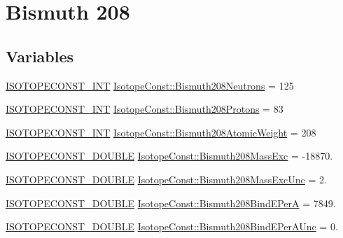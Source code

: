 \hypertarget{group___isotope_const-_bismuth-_bi208}{}\section{Bismuth 208}
\label{group___isotope_const-_bismuth-_bi208}
\subsection*{Variables}
\begin{DoxyCompactItemize}
\item 
\mbox{\hyperlink{group___isotope_const-_macros_ga5f18360b3e99483a35c32d789e62621c}{I\+S\+O\+T\+O\+P\+E\+C\+O\+N\+S\+T\+\_\+\+I\+NT}} \mbox{\hyperlink{group___isotope_const-_bismuth-_bi208_ga40ab444ee61c20c12a0172e54779f983}{Isotope\+Const\+::\+Bismuth208\+Neutrons}} = 125
\item 
\mbox{\hyperlink{group___isotope_const-_macros_ga5f18360b3e99483a35c32d789e62621c}{I\+S\+O\+T\+O\+P\+E\+C\+O\+N\+S\+T\+\_\+\+I\+NT}} \mbox{\hyperlink{group___isotope_const-_bismuth-_bi208_ga6ad34f2da74e0460bca20566deadcd7a}{Isotope\+Const\+::\+Bismuth208\+Protons}} = 83
\item 
\mbox{\hyperlink{group___isotope_const-_macros_ga5f18360b3e99483a35c32d789e62621c}{I\+S\+O\+T\+O\+P\+E\+C\+O\+N\+S\+T\+\_\+\+I\+NT}} \mbox{\hyperlink{group___isotope_const-_bismuth-_bi208_ga58b395a05223b5c11aa0f8f3c5637777}{Isotope\+Const\+::\+Bismuth208\+Atomic\+Weight}} = 208
\item 
\mbox{\hyperlink{group___isotope_const-_macros_ga8f45a7272ce02c0b4c65c44636ed719a}{I\+S\+O\+T\+O\+P\+E\+C\+O\+N\+S\+T\+\_\+\+D\+O\+U\+B\+LE}} \mbox{\hyperlink{group___isotope_const-_bismuth-_bi208_ga3b0a19e4060de80103b82520d961e371}{Isotope\+Const\+::\+Bismuth208\+Mass\+Exc}} = -\/18870.
\item 
\mbox{\hyperlink{group___isotope_const-_macros_ga8f45a7272ce02c0b4c65c44636ed719a}{I\+S\+O\+T\+O\+P\+E\+C\+O\+N\+S\+T\+\_\+\+D\+O\+U\+B\+LE}} \mbox{\hyperlink{group___isotope_const-_bismuth-_bi208_ga06f25454a4ba7e07e56e6b0b39fbec52}{Isotope\+Const\+::\+Bismuth208\+Mass\+Exc\+Unc}} = 2.
\item 
\mbox{\hyperlink{group___isotope_const-_macros_ga8f45a7272ce02c0b4c65c44636ed719a}{I\+S\+O\+T\+O\+P\+E\+C\+O\+N\+S\+T\+\_\+\+D\+O\+U\+B\+LE}} \mbox{\hyperlink{group___isotope_const-_bismuth-_bi208_ga46d6d56d52d32fc382852aa88d6d9e3e}{Isotope\+Const\+::\+Bismuth208\+Bind\+E\+PerA}} = 7849.
\item 
\mbox{\hyperlink{group___isotope_const-_macros_ga8f45a7272ce02c0b4c65c44636ed719a}{I\+S\+O\+T\+O\+P\+E\+C\+O\+N\+S\+T\+\_\+\+D\+O\+U\+B\+LE}} \mbox{\hyperlink{group___isotope_const-_bismuth-_bi208_ga483d007d71625d770771cfa3d26e55c7}{Isotope\+Const\+::\+Bismuth208\+Bind\+E\+Per\+A\+Unc}} = 0.

\end{DoxyCompactItemize}
